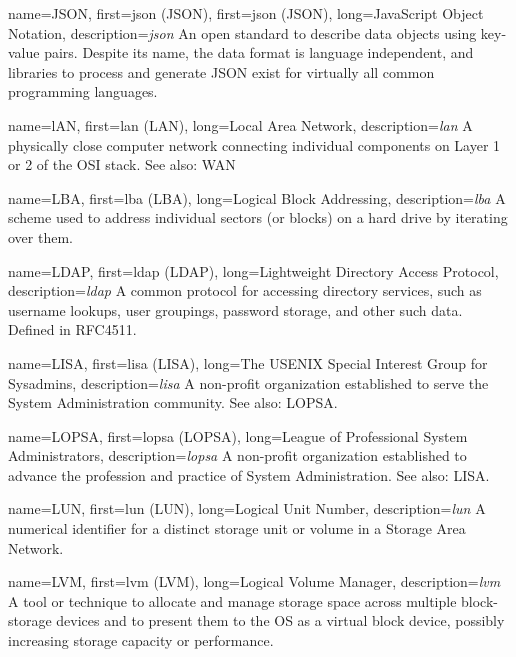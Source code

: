 {
	name={JSON},
	first={\acrlong{json} (JSON)},
	first={\acrlong{json} (JSON)},
	long={JavaScript Object Notation},
	description={{\em \acrlong{json}} An
open standard to describe data
objects using key-value pairs.  Despite its name, the
data format is language independent, and libraries to
process and generate JSON exist for virtually all
common programming languages.
	}
}

{
	name={lAN},
	first={\acrlong{lan} (LAN)},
	long={Local Area Network},
	description={{\em \acrlong{lan}} A physically
close computer network connecting individual
components on Layer 1 or 2 of the OSI stack. See also:
WAN}
}

{
	name={LBA},
	first={\acrlong{lba} (LBA)},
	long={Logical Block Addressing},
	description={{\em \acrlong{lba}} A scheme used to address
individual sectors (or blocks) on a hard drive by
iterating over them.}
}

{
	name={LDAP},
	first={\acrlong{ldap} (LDAP)},
	long={Lightweight Directory Access Protocol},
	description={{\em \acrlong{ldap}} A common protocol
for accessing directory services, such as username lookups, user
groupings, password storage, and other such data.
Defined in RFC4511.}
}

{
	name={LISA},
	first={\acrlong{lisa} (LISA)},
	long={The USENIX Special Interest Group for Sysadmins},
	description={{\em \acrlong{lisa}} A non-profit
organization established to serve the System Administration community.
See also: LOPSA.}
}

{
	name={LOPSA},
	first={\acrlong{lopsa} (LOPSA)},
	long={League of Professional System Administrators},
	description={{\em \acrlong{lopsa}} A non-profit
organization established to advance the profession and practice of System
Administration.  See also: LISA.}
}

{
	name={LUN},
	first={\acrlong{lun} (LUN)},
	long={Logical Unit Number},
	description={{\em \acrlong{lun}} A numerical identifier for a distinct
storage unit or volume in a Storage Area Network.}
}

{
	name={LVM},
	first={\acrlong{lvm} (LVM)},
	long={Logical Volume Manager},
	description={{\em \acrlong{lvm}} A tool or
technique to allocate and manage storage space across
multiple block-storage devices and to present them to
the OS as a virtual block device, possibly increasing
storage capacity or performance. }
}

